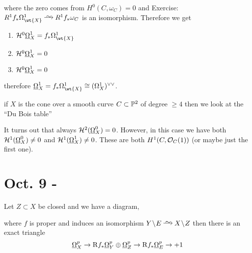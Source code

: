 \documentclass[12pt]{article}
\newcommand{\R}{\mathrm{R}}
\renewcommand{\cH}{\mathcal{H}}
\begin{document}
\begin{example}
\begin{enumerate}
where the zero comes from $H^0(C, \omega_C) = 0$ 
and Exercise: $R^1 f_* \Omega_{\wt{X}}^1 \iso R^1 f_* \omega_C$ is an isomorphism. Therefore we get
\begin{enumerate}
\item $\cH^0 \ul{\Omega}_X^1 = f_* \Omega_{\wt{X}}^1$
\item $\cH^0 \ul{\Omega}_X^1 = 0$
\item $\cH^0 \ul{\Omega}_X^1 = 0$
\end{enumerate}
therefore $\ul{\Omega}_X^1 = f_* \Omega_{\wt{X}}^1 \cong (\Omega_X^1)^{\vee \vee}$. 
\end{enumerate}
\item if $X$ is the cone over a smooth curve $C \subset \P^2$ of degree $\ge 4$ then we look at the ``Du Bois table''
\begin{center}
\end{center}
It turns out that always $\cH^2(\ul{\Omega}_X^0) = 0$. However, in this case we have both $\cH^1(\ul{\Omega}_X^0) \neq 0$ and $\cH^1(\ul{\Omega}_X^1) \neq 0$. These are both $H^1(C, \struct{C}(1))$ (or maybe just the first one). 
\end{example}

\section{Oct. 9 - }

\begin{prop}
Let $Z \subset X$ be closed and we have a diagram,
\begin{center}
\end{center}
where $f$ is proper and induces an isomorphism $Y \sm E \iso X \sm Z$ then there is an exact triangle
\[ \ul{\Omega}_X^p \to \R f_* \ul{\Omega}_Y^p \oplus \ul{\Omega}_Z^p \to \R f_* \ul{\Omega}_E^p \to + 1 \]
\end{prop}
\end{document}
